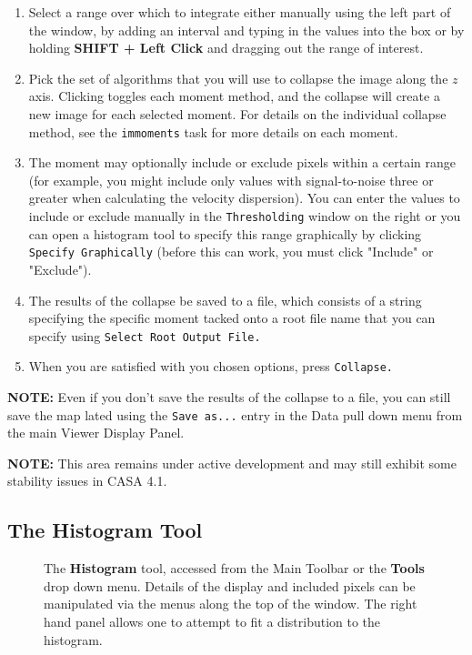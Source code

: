 \begin{enumerate}
\item Select a range over which to integrate either manually using the left part of the window, 
by adding an interval and typing in the values into the box or by holding {\bf SHIFT + Left Click}
and dragging out the range of interest.
\item Pick the set of algorithms that you will use to collapse the image along the $z$ axis. Clicking
toggles each moment method, and the collapse will create a new image for each selected moment.
For details on the individual collapse method, see the {\tt immoments} task for more details on
each moment.
\item The moment may optionally include or exclude pixels within a certain range (for example,
you might include only values with signal-to-noise three or greater when calculating the velocity dispersion). You
can enter the values to include or exclude manually in the {\tt Thresholding} window on the right or you can
open a histogram tool to specify this range graphically by clicking {\tt Specify Graphically} (before this can
work, you must click "Include" or "Exclude").
\item The results of the collapse be saved to a file, which consists of a string specifying the specific moment tacked onto
a root file name that you can specify using {\tt Select Root Output File.}
\item When you are satisfied with you chosen options, press {\tt Collapse.}
\end{enumerate}

{\bf NOTE:} Even if you don't save the results of the collapse to a file, you can still save the map lated using the {\tt Save as...} entry in the 
Data pull down menu from the main Viewer Display Panel.

{\bf NOTE:} This area remains under active development and may still exhibit some stability issues in CASA 4.1.


\subsection{The Histogram Tool}
\label{section:display.image.histogram}

\begin{figure}[h!]
\begin{center}
\caption{\label{fig:viewer_histogram} The {\bf Histogram} tool, accessed from
the Main Toolbar or the {\bf Tools} drop down menu. Details of the display and
included pixels can be manipulated
via the menus along the top of the window. The right hand panel allows one to
attempt to fit a distribution to the histogram.}
\hrulefill
\end{center}
\end{figure}

